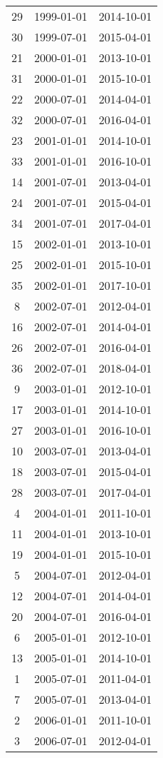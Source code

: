 % 
\begin{tabular}{ccc}
  \hline
  \hline
29 & 1999-01-01 & 2014-10-01 \\ 
  30 & 1999-07-01 & 2015-04-01 \\ 
  21 & 2000-01-01 & 2013-10-01 \\ 
  31 & 2000-01-01 & 2015-10-01 \\ 
  22 & 2000-07-01 & 2014-04-01 \\ 
  32 & 2000-07-01 & 2016-04-01 \\ 
  23 & 2001-01-01 & 2014-10-01 \\ 
  33 & 2001-01-01 & 2016-10-01 \\ 
  14 & 2001-07-01 & 2013-04-01 \\ 
  24 & 2001-07-01 & 2015-04-01 \\ 
  34 & 2001-07-01 & 2017-04-01 \\ 
  15 & 2002-01-01 & 2013-10-01 \\ 
  25 & 2002-01-01 & 2015-10-01 \\ 
  35 & 2002-01-01 & 2017-10-01 \\ 
  8 & 2002-07-01 & 2012-04-01 \\ 
  16 & 2002-07-01 & 2014-04-01 \\ 
  26 & 2002-07-01 & 2016-04-01 \\ 
  36 & 2002-07-01 & 2018-04-01 \\ 
  9 & 2003-01-01 & 2012-10-01 \\ 
  17 & 2003-01-01 & 2014-10-01 \\ 
  27 & 2003-01-01 & 2016-10-01 \\ 
  10 & 2003-07-01 & 2013-04-01 \\ 
  18 & 2003-07-01 & 2015-04-01 \\ 
  28 & 2003-07-01 & 2017-04-01 \\ 
  4 & 2004-01-01 & 2011-10-01 \\ 
  11 & 2004-01-01 & 2013-10-01 \\ 
  19 & 2004-01-01 & 2015-10-01 \\ 
  5 & 2004-07-01 & 2012-04-01 \\ 
  12 & 2004-07-01 & 2014-04-01 \\ 
  20 & 2004-07-01 & 2016-04-01 \\ 
  6 & 2005-01-01 & 2012-10-01 \\ 
  13 & 2005-01-01 & 2014-10-01 \\ 
  1 & 2005-07-01 & 2011-04-01 \\ 
  7 & 2005-07-01 & 2013-04-01 \\ 
  2 & 2006-01-01 & 2011-10-01 \\ 
  3 & 2006-07-01 & 2012-04-01 \\ 
   \hline
\end{tabular}
